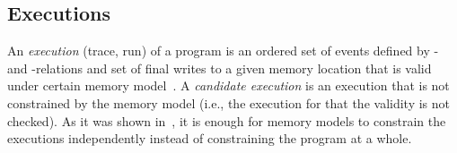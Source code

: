 

\subsection{Executions}
\label{ch:wmm:model:executions}

An \textit{execution} (trace, run) of a program is an ordered set of events defined by \po- and \rf-relations and set of final writes to a given memory location that is valid under certain memory model~\cite{alglave2014herding}. A \textit{candidate execution} is an execution that is not constrained by the memory model (i.e., the execution for that the validity is not checked). As it was shown in~\cite{wickerson2017automatically}, it is enough for memory models to constrain the executions independently instead of constraining the program at a whole.

